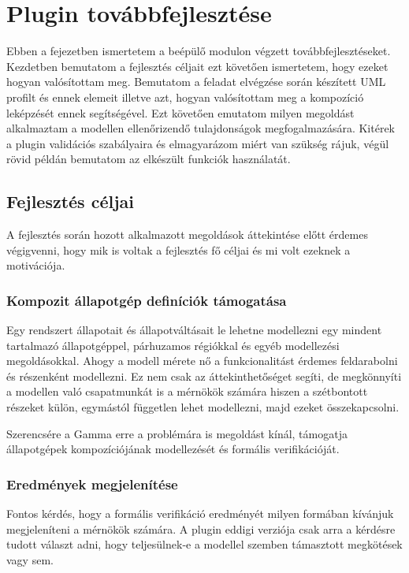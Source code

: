 \chapter{Plugin továbbfejlesztése}

Ebben a fejezetben ismertetem a beépülő modulon végzett továbbfejlesztéseket. Kezdetben bemutatom a fejlesztés céljait ezt követően ismertetem, hogy ezeket hogyan valósítottam meg. Bemutatom a feladat elvégzése során készített UML profilt és ennek elemeit illetve azt, hogyan valósítottam meg a kompozíció leképzését ennek segítségével. Ezt követően emutatom milyen megoldást alkalmaztam a modellen ellenőrizendő tulajdonságok megfogalmazására. Kitérek a plugin validációs szabályaira és elmagyarázom miért van szükség rájuk, végül rövid példán bemutatom az elkészült funkciók használatát.

\section{Fejlesztés céljai}

A fejlesztés során hozott alkalmazott megoldások áttekintése előtt érdemes végigvenni, hogy mik is voltak a fejlesztés fő céljai és mi volt ezeknek a motivációja.

\subsection{Kompozit állapotgép definíciók támogatása}
Egy rendszert állapotait és állapotváltásait le lehetne modellezni egy mindent tartalmazó állapotgéppel, párhuzamos régiókkal és egyéb modellezési megoldásokkal. Ahogy a modell mérete nő a funkcionalitást érdemes feldarabolni és részenként modellezni. Ez nem csak az áttekinthetőséget segíti, de megkönnyíti a modellen való csapatmunkát is a mérnökök számára hiszen a szétbontott részeket külön, egymástól független lehet modellezni, majd ezeket összekapcsolni.

Szerencsére a Gamma erre a problémára is megoldást kínál, támogatja állapotgépek kompozíciójának modellezését és formális verifikációját.

\subsection{Eredmények megjelenítése}
Fontos kérdés, hogy a formális verifikáció eredményét milyen formában kívánjuk megjeleníteni a mérnökök számára. A plugin eddigi verziója csak arra a kérdésre tudott választ adni, hogy teljesülnek-e a modellel szemben támasztott megkötések vagy sem.

